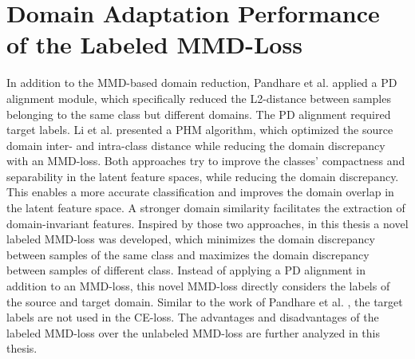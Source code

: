 \section{Domain Adaptation Performance of the Labeled MMD-Loss}
In addition to the MMD-based domain reduction, Pandhare et al. \cite{Pandhare2021} applied a PD alignment module, which specifically reduced the L2-distance between samples belonging to the same class but different domains. The PD alignment required target labels. Li et al. \cite{Li2018} presented a PHM algorithm, which optimized the source domain inter- and intra-class distance while reducing the domain discrepancy with an MMD-loss. Both approaches try to improve the classes' compactness and separability in the latent feature spaces, while reducing the domain discrepancy. This enables a more accurate classification and improves the domain overlap in the latent feature space. A stronger domain similarity facilitates the extraction of domain-invariant features. Inspired by those two approaches, in this thesis a novel labeled MMD-loss was developed, which minimizes the domain discrepancy between samples of the same class and maximizes the domain discrepancy between samples of different class. Instead of applying a PD alignment in addition to an MMD-loss, this novel MMD-loss directly considers the labels of the source and target domain. Similar to the work of Pandhare et al. \cite{Pandhare2021}, the target labels are not used in the CE-loss. The advantages and disadvantages of the labeled MMD-loss over the unlabeled MMD-loss are further analyzed in this thesis.

